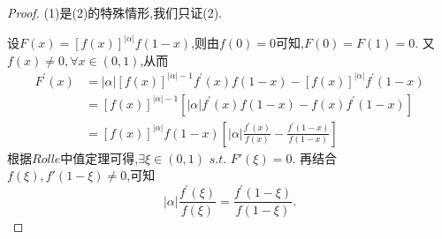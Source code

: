 \documentclass[lang=cn,newtx,10pt,scheme=chinese]{../Template/elegantbook}
\begin{document}
\begin{proof}
    (1)是(2)的特殊情形,我们只证(2).

    设$F\left( x \right) =\left[ f\left( x \right) \right] ^{\left| \alpha \right|}f\left( 1-x \right)$,则由$f(0)=0$可知,$F(0)=F(1)=0$.
    又$f(x)\ne0,\forall x\in(0,1)$,从而
    \begin{equation}
        \begin{split}
            F^{\prime}\left( x \right) &=\left| \alpha \right|\left[ f\left( x \right) \right] ^{\left| \alpha \right|-1}f^{\prime}(x)f(1-x)-\left[ f\left( x \right) \right] ^{\left| \alpha \right|}f^{\prime}(1-x)
\\
&=\left[ f\left( x \right) \right] ^{\left| \alpha \right|-1}\left[ \left| \alpha \right|f^{\prime}(x)f(1-x)-f(x)f^{\prime}(1-x) \right]
\\
&=\left[ f\left( x \right) \right] ^{\left| \alpha \right|}f(1-x)\left[ \left| \alpha \right|\frac{f^{\prime}(x)}{f(x)}-\frac{f^{\prime}(1-x)}{f(1-x)} \right]        
\end{split}
        \nonumber
    \end{equation}
    根据$Rolle$中值定理可得,$\exists \xi \in (0,1)\,\,s.t.\,\,F'\left( \xi \right) =0$.
    再结合$f(\xi),f'(1-\xi)\ne0$,可知
    \begin{equation}
        \vert\alpha\vert\frac{f^{\prime}(\xi)}{f(\xi)}=\frac{f^{\prime}(1-\xi)}{f(1-\xi)}.
        \nonumber
    \end{equation}
\end{proof}
\end{document}

